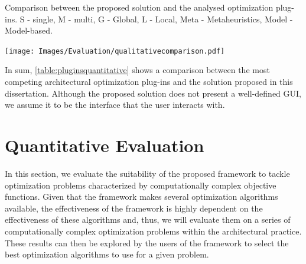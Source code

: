 \begin{table}[htbp]		
	\centering
	\caption[Comparison between the proposed solution and the analysed optimization plug-ins]{Comparison between the proposed solution and the analysed optimization plug-ins. S - single, M - multi, G - Global, L - Local, Meta - Metaheuristics, Model - Model-based.}
	\label{table:pluginsquantitative}
	\texttt{[image: Images/Evaluation/qualitativecomparison.pdf]}
\end{table}

In sum, \cref{table:pluginsquantitative} shows a comparison between the most competing architectural optimization plug-ins and the solution proposed in this dissertation. Although the proposed solution does not present a well-defined \ac{GUI}, we assume it to be the interface that the user interacts with.
\section{Quantitative Evaluation}
\label{sec:quantitative}

In this section, we evaluate the suitability of the proposed framework to tackle optimization problems characterized by computationally complex objective functions. Given that the framework makes several optimization algorithms available, the effectiveness of the framework is highly dependent on the effectiveness of these algorithms and, thus, we will evaluate them on a series of computationally complex optimization problems within the architectural practice. These results can then be explored by the users of the framework to select the best optimization algorithms to use for a given problem.


